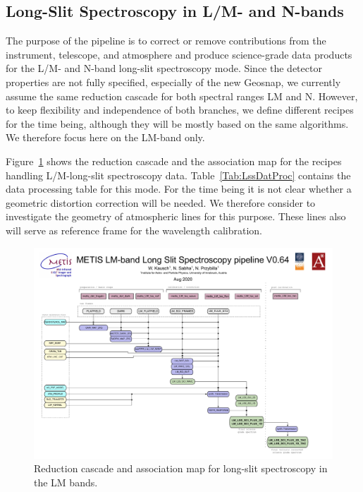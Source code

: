 \subsection{Long-Slit Spectroscopy in L/M- and N-bands}

The purpose of the pipeline is to correct or remove contributions from
the instrument, telescope, and atmosphere and produce science-grade
data products for the L/M- and N-band long-slit spectroscopy
mode. Since the detector properties are not fully specified, especially of the new Geosnap, we currently assume
the same reduction cascade for both spectral ranges LM and
N. However, to keep flexibility and independence of both branches, we
define different recipes for the time being, although they will be
mostly based on the same algorithms. We therefore focus here on the LM-band only.

Figure~\ref{Fig:LMLssAssomap} shows the reduction cascade and the association map for the recipes handling L/M-long-slit
spectroscopy data.  Table~\ref{Tab:LssDatProc} contains the data processing table for this mode. For the time being it is not clear whether a geometric
distortion correction will be needed. We therefore consider to investigate
the geometry of atmospheric lines for this purpose. These lines also will
serve as reference frame for the wavelength calibration.

\begin{figure}
  \centering
  \includegraphics[width=0.9\textheight]{figures/LM_LSS_pipeline_wf_draft_latest_v0.64.pdf}
  \caption[Reduction cascade and association map for LM long-slit
  spectroscopy]{Reduction cascade and association map for long-slit
    spectroscopy in the LM bands.  }
  \label{Fig:LMLssAssomap}
\end{figure}

